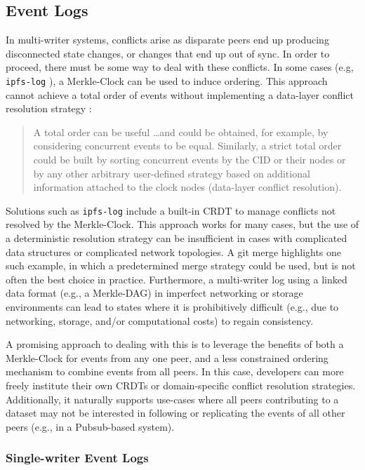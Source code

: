 \documentclass{textile}
\begin{document}
\subsection{Event Logs}

In multi-writer systems, conflicts arise as disparate peers end up producing disconnected state changes, or changes that end up out of sync. In order to proceed, there must be some way to deal with these conflicts. In some cases (e.g, \texttt{ipfs-log} \cite{markroberthendersonOrbitDBFieldManual2019}), a Merkle-Clock can be used to induce ordering. This approach cannot achieve a total order of events without implementing a data-layer conflict resolution strategy \cite{sanjuanMerkleCRDTs2019}:

\begin{quote}
A total order can be useful \dots and could be obtained, for example, by considering concurrent events to be equal. Similarly, a strict total order could be built by sorting concurrent events by the CID or their nodes or by any other arbitrary user-defined strategy based on additional information attached to the clock nodes (data-layer conflict resolution).
\end{quote}

Solutions such as \texttt{ipfs-log} include a built-in CRDT to manage conflicts not resolved by the Merkle-Clock. This approach works for many cases, but the use of a deterministic resolution strategy can be insufficient in cases with complicated data structures or complicated network topologies. A git merge highlights one such example, in which a predetermined merge strategy could be used, but is not often the best choice in practice. Furthermore, a multi-writer log using a linked data format (e.g., a Merkle-DAG) in imperfect networking or storage environments can lead to states where it is prohibitively difficult (e.g., due to networking, storage, and/or computational costs) to regain consistency.

A promising approach to dealing with this is to leverage the benefits of both a Merkle-Clock for events from any one peer, and a less constrained ordering mechanism to combine events from all peers. In this case, developers can more freely institute their own CRDTs or domain-specific conflict resolution strategies. Additionally, it naturally supports use-cases where all peers contributing to a dataset may not be interested in following or replicating the events of all other peers (e.g., in a Pubsub-based system).

\subsubsection{Single-writer Event Logs}
\end{document}
